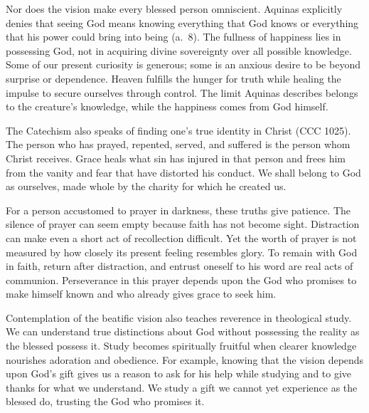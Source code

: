 Nor does the vision make every blessed person omniscient. Aquinas explicitly denies that seeing God means knowing everything that God knows or everything that his power could bring into being (a.~8). The fullness of happiness lies in possessing God, not in acquiring divine sovereignty over all possible knowledge. Some of our present curiosity is generous; some is an anxious desire to be beyond surprise or dependence. Heaven fulfills the hunger for truth while healing the impulse to secure ourselves through control. The limit Aquinas describes belongs to the creature's knowledge, while the happiness comes from God himself.

The Catechism also speaks of finding one's true identity in Christ (CCC 1025). The person who has prayed, repented, served, and suffered is the person whom Christ receives. Grace heals what sin has injured in that person and frees him from the vanity and fear that have distorted his conduct. We shall belong to God as ourselves, made whole by the charity for which he created us.

For a person accustomed to prayer in darkness, these truths give patience. The silence of prayer can seem empty because faith has not become sight. Distraction can make even a short act of recollection difficult. Yet the worth of prayer is not measured by how closely its present feeling resembles glory. To remain with God in faith, return after distraction, and entrust oneself to his word are real acts of communion. Perseverance in this prayer depends upon the God who promises to make himself known and who already gives grace to seek him.

Contemplation of the beatific vision also teaches reverence in theological study. We can understand true distinctions about God without possessing the reality as the blessed possess it. Study becomes spiritually fruitful when clearer knowledge nourishes adoration and obedience. For example, knowing that the vision depends upon God's gift gives us a reason to ask for his help while studying and to give thanks for what we understand. We study a gift we cannot yet experience as the blessed do, trusting the God who promises it.

